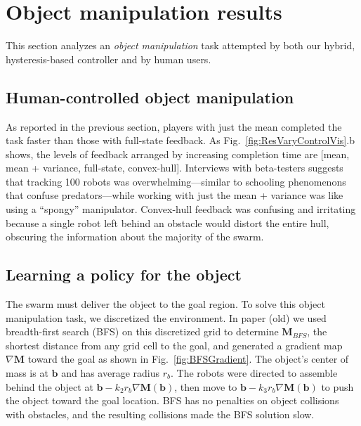 
\section{Object manipulation results}\label{sec:exp}

This section analyzes an \emph{object manipulation} task attempted by both our hybrid, hysteresis-based controller and by human users.  

\subsection{Human-controlled object manipulation}



As reported in the previous section, players with just the mean completed the task faster than those with full-state feedback.  As Fig.~\ref{fig:ResVaryControlVis}.b shows, the levels of feedback arranged by increasing completion time are [mean, mean + variance, full-state, convex-hull].  Interviews with  beta-testers suggests that tracking 100 robots was overwhelming---similar to schooling phenomenons that confuse predators---while working with just the mean + variance was like using a ``spongy'' manipulator. Convex-hull feedback was confusing and irritating because a single robot left behind an obstacle would distort the entire hull, obscuring the information about the majority of the swarm.


\subsection{Learning a policy for the object}
The swarm must deliver the object to the goal region.  To solve this object manipulation task, we discretized the environment. 
In paper (old) we used breadth-first search (BFS) on this discretized grid to determine $\mathbf{M}_{BFS}$, the shortest distance from any grid cell to the goal, and generated a gradient map $\nabla \mathbf{M}$ toward the goal as shown in Fig.~\ref{fig:BFSGradient}.  The object's center of mass is at $\mathbf{b}$ and has average radius $r_b$. 
The robots were directed to assemble behind the object at  $\mathbf{b} - k_2 r_b \nabla \mathbf{M}(\mathbf{b})$, then move to  $\mathbf{b} - k_3 r_b \nabla \mathbf{M}(\mathbf{b})$ to push the object toward the goal location. BFS has no penalties on object collisions with obstacles, and the resulting collisions made the BFS solution slow.


